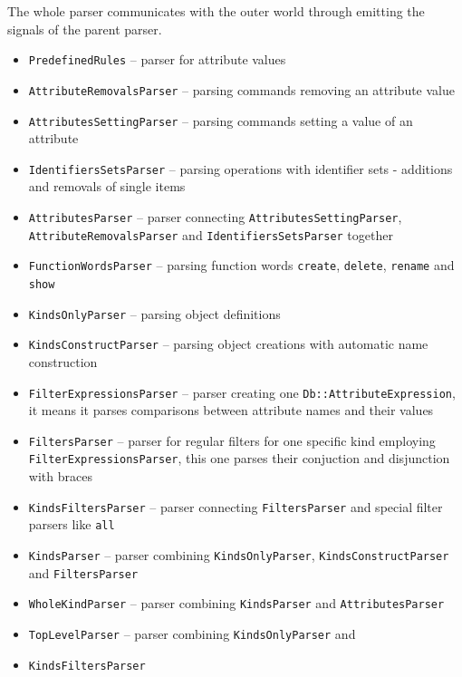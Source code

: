 \documentclass[deska]{subfiles}
\begin{document}
The whole parser communicates with the outer world through emitting the signals of the parent parser.

\begin{itemize}
    \item {\tt PredefinedRules} -- parser for attribute values
    \item {\tt AttributeRemovalsParser} -- parsing commands removing an attribute value
    \item {\tt AttributesSettingParser} -- parsing commands setting a value of an attribute 
    \item {\tt IdentifiersSetsParser} -- parsing operations with identifier sets - additions and removals of single items
    \item {\tt AttributesParser} -- parser connecting {\tt AttributesSettingParser}, {\tt AttributeRemovalsParser} and
                                    {\tt IdentifiersSetsParser} together 
    \item {\tt FunctionWordsParser} -- parsing function words {\tt create}, {\tt delete}, {\tt rename} and {\tt show}
    \item {\tt KindsOnlyParser} -- parsing object definitions
    \item {\tt KindsConstructParser} -- parsing object creations with automatic name construction
    \item {\tt FilterExpressionsParser} -- parser creating one {\tt Db::AttributeExpression}, it means it parses comparisons between
                                           attribute names and their values
    \item {\tt FiltersParser} -- parser for regular filters for one specific kind employing {\tt FilterExpressionsParser}, this one parses
                                 their conjuction and disjunction with braces 
    \item {\tt KindsFiltersParser} -- parser connecting {\tt FiltersParser} and special filter parsers like {\tt all} 
    \item {\tt KindsParser} -- parser combining {\tt KindsOnlyParser}, {\tt KindsConstructParser} and {\tt FiltersParser}
    \item {\tt WholeKindParser} -- parser combining {\tt KindsParser} and {\tt AttributesParser}  
    \item {\tt TopLevelParser} -- parser combining {\tt KindsOnlyParser} and \item {\tt KindsFiltersParser}
\end{itemize}
\end{document}
